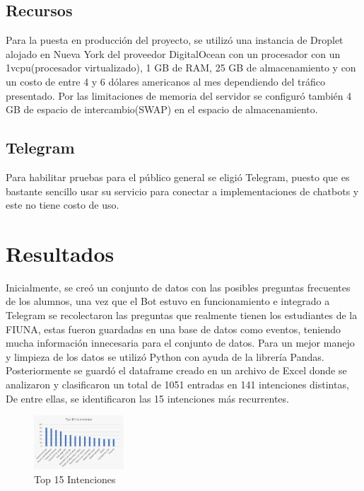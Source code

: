 \subsection{Recursos}

Para la puesta en producción del proyecto, se utilizó una instancia de Droplet alojado en Nueva
York del proveedor DigitalOcean con un procesador con un 1vcpu(procesador virtualizado), 1 GB de
RAM, 25 GB de almacenamiento y con un costo de entre 4 y 6 dólares americanos al mes dependiendo
del tráfico presentado. Por las limitaciones de memoria del servidor se configuró también 4 GB de
espacio de intercambio(SWAP) en el espacio de almacenamiento.

\subsection{Telegram}

Para habilitar pruebas para el público general se eligió Telegram, puesto que es bastante sencillo
usar su servicio para conectar a implementaciones de chatbots y este no tiene costo de uso.
\cite{botfather}

\section{Resultados}
Inicialmente, se creó un conjunto de datos con las posibles preguntas frecuentes de los alumnos,
una vez que el Bot estuvo en funcionamiento e integrado a Telegram se recolectaron las preguntas
que realmente tienen los estudiantes de la FIUNA, estas fueron guardadas en una base de datos como
eventos, teniendo mucha información innecesaria para el conjunto de datos. Para un mejor manejo y
limpieza de los datos se utilizó Python con ayuda de la librería Pandas. Posteriormente se guardó
el dataframe creado en un archivo de Excel donde se analizaron y clasificaron un total de 1051
entradas en 141 intenciones distintas, De entre ellas, se identificaron las 15 intenciones más
recurrentes.

\begin{figure}[H]
	\centering
	\includegraphics[angle=0,width=0.3\textwidth]{Figuras/Top15intents.jpeg}
	\caption{Top 15 Intenciones}
	\label{fig:Top15intents}
\end{figure}

